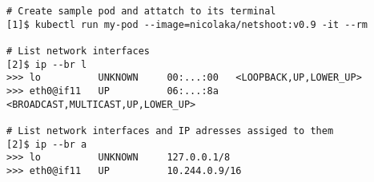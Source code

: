 \begin{lstfloat}
\begin{lstlisting}[style=mybashstyle,
caption={Nastavení síťových prostředků v podu},
label={cmd:podNet}
]
# Create sample pod and attatch to its terminal
[1]$ kubectl run my-pod --image=nicolaka/netshoot:v0.9 -it --rm

# List network interfaces
[2]$ ip --br l
>>> lo          UNKNOWN     00:...:00   <LOOPBACK,UP,LOWER_UP> 
>>> eth0@if11   UP          06:...:8a   <BROADCAST,MULTICAST,UP,LOWER_UP>

# List network interfaces and IP adresses assiged to them
[2]$ ip --br a
>>> lo          UNKNOWN     127.0.0.1/8 
>>> eth0@if11   UP          10.244.0.9/16  
\end{lstlisting}
\end{lstfloat}